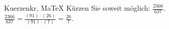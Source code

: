 \begin{MAufgabe}{Kuerzen}{kr, MaTeX}
K\"urzen Sie soweit m\"oglich: $\frac{2366}{637}$.\\ 
\ifLsg\MLoesung
\quad $\frac{2366}{637}=\frac{(91)\cdot(26)}{(91)\cdot(7)}=\frac{26}{7}$.\else\relax\fi
 \end{MAufgabe}